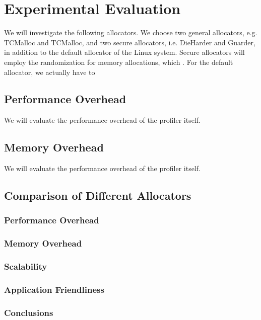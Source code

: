 \section{Experimental Evaluation}
\label{sec:evaluation}

We will investigate the following allocators. We choose two general allocators, e.g. TCMalloc and TCMalloc, and two secure allocators, i.e. DieHarder and Guarder, in addition to the default allocator of the Linux system. Secure allocators will employ the randomization for memory allocations, which . 
For the default allocator, we actually have to 

\subsection{Performance Overhead}

We will evaluate the performance overhead of the profiler itself. 

\subsection{Memory Overhead}
We will evaluate the performance overhead of the profiler itself. 

\subsection{Comparison of Different Allocators}

\subsubsection{Performance Overhead}

\subsubsection{Memory Overhead}

\subsubsection{Scalability}

\subsubsection{Application Friendliness}

\subsubsection{Conclusions}

